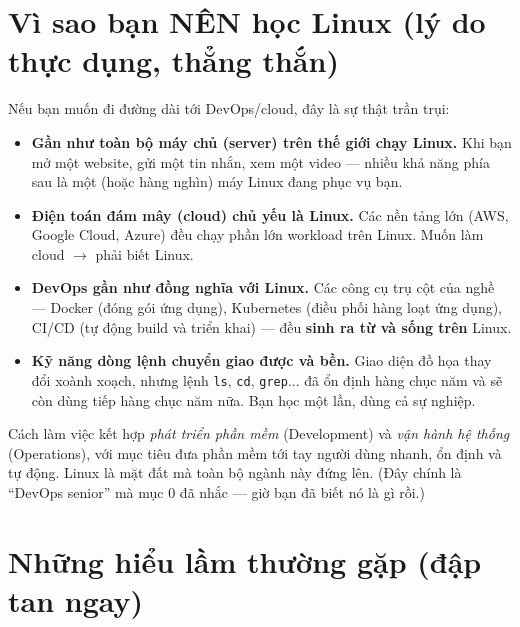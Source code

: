 \documentclass[12pt,a4paper]{article}
\begin{document}
\section{Vì sao bạn NÊN học Linux (lý do thực dụng, thẳng thắn)}

Nếu bạn muốn đi đường dài tới DevOps/cloud, đây là sự thật trần trụi:

\begin{itemize}[leftmargin=*]
  \item \textbf{Gần như toàn bộ máy chủ (server) trên thế giới chạy Linux.} Khi bạn mở một website, gửi một tin nhắn, xem một video — nhiều khả năng phía sau là một (hoặc hàng nghìn) máy Linux đang phục vụ bạn.
  \item \textbf{Điện toán đám mây (cloud) chủ yếu là Linux.} Các nền tảng lớn (AWS, Google Cloud, Azure) đều chạy phần lớn workload trên Linux. Muốn làm cloud $\rightarrow$ phải biết Linux.
  \item \textbf{DevOps gần như đồng nghĩa với Linux.} Các công cụ trụ cột của nghề — Docker (đóng gói ứng dụng), Kubernetes (điều phối hàng loạt ứng dụng), CI/CD (tự động build và triển khai) — đều \textbf{sinh ra từ và sống trên} Linux.
  \item \textbf{Kỹ năng dòng lệnh chuyển giao được và bền.} Giao diện đồ họa thay đổi xoành xoạch, nhưng lệnh \texttt{ls}, \texttt{cd}, \texttt{grep}... đã ổn định hàng chục năm và sẽ còn dùng tiếp hàng chục năm nữa. Bạn học một lần, dùng cả sự nghiệp.
\end{itemize}

\begin{defbox}
Cách làm việc kết hợp \textit{phát triển phần mềm} (Development) và \textit{vận hành hệ thống} (Operations), với mục tiêu đưa phần mềm tới tay người dùng nhanh, ổn định và tự động. Linux là mặt đất mà toàn bộ ngành này đứng lên. (Đây chính là ``DevOps senior'' mà mục 0 đã nhắc — giờ bạn đã biết nó là gì rồi.)
\end{defbox}

\section{Những hiểu lầm thường gặp (đập tan ngay)}
\end{document}

